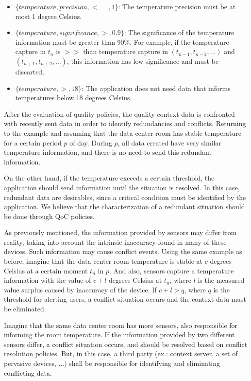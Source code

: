 \documentclass[letterpaper,conference]{IEEEtran}
\begin{document}
 \begin{itemize}
  \item $\{temperature, precision, <=, 1\}$: The temperature precision must be at most 
					      1 degree Celsius.
  \item $\{temperature, significance, >, 0.9\}$: The significance of the temperature 
						  information must be greater than 90\%.
						  For example, if the temperature capture 
						  in $t_n$ is $>>$ than temperature 
						  capture in $(t_\mathit{n-1}, t_\mathit{n-2}, \dots)$ 
						  and $(t_\mathit{n+1},t_\mathit{n+2}, \dots)$, 
						  this information has low significance 
						  and must be discarted. 
  \item $\{temperature, >, 18\}$:  The application does not need data that informs 
				    temperatures below 18 degrees Celsius.
                     
 \end{itemize} 
 
 After the evaluation of quality policies, the quality context data is confronted with 
 recently sent data in order to identify redundancies and conflicts. Returning to the 
 example and assuming that the data center room has stable temperature for a certain 
 period $p$ of day. During $p$, all data created have very similar temperature 
 information, and there is no need to send this redundant information. 
 
 On the other hand, if the temperature exceeds a certain threshold, the application 
 should send information until the situation is resolved. In this case, redundant data 
 are desirables, since a critical condition must be identified by the application. We 
 believe that the characterization of a redundant situation should be done through QoC 
 policies.
 
  As previously mentioned, the information provided by sensors may differ from reality, 
  taking into account the intrinsic inaccuracy found in many of these devices. Such 
 information may cause conflict events. Using the same example as before, imagine that 
 the data center room temperature is stable at $c$ degrees Celsius at a certain moment
 $t_n$ in $p$. And also, sensors capture a temperature information with the value of $c+l$ 
 degrees Celsius at $t_n$, where $l$ is the measured value surplus caused by inaccuracy 
 of the device. If $c+l>q$, where $q$ is the threshold for alerting users, a conflict
 situation occurs and the context data must be eliminated. 
 
 Imagine that the same data center room has more sensors, also responsible for informing
 the room temperature. If the information provided by two different sensors differ, a 
 conflict situation occurs, and should be resolved based on conflict resolution policies.
 But, in this case, a third party (ex.: context server, a set of pervasive devices, ...) 
 shall be responsible for identifying and eliminating conflicting data.
 
\end{document}
